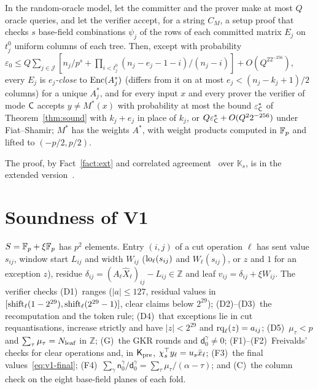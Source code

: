 \begin{theorem}
\label{thm:untrusted}
In the random-oracle model, let the committer and the prover make at most $Q$ oracle queries,
and let the verifier accept, for a string $C_M$, a setup proof that checks
$s$ base-field combinations $\psi_j$ of the rows of each committed matrix $E_j$ on $t^0_j$ uniform
columns of each tree. Then, except
with probability $\varepsilon_0\le Q\sum_{j\in\mathcal J}[n_j/p^s+\prod_{i<t^0_j}(n_j-e_j-1-i)/(n_j-i)]+O(Q^22^{-256})$, every $E_j$ is \emph{$e_j$-close} to $\mathrm{Enc}(A^*_j)$
(differs from it on at most $e_j<(n_j-k_j+1)/2$ columns) for a unique $A^*_j$, and for every input $x$ and every prover the verifier of mode
$\mathsf{C}$ accepts $y\neq M^*(x)$ with probability at most the bound $\varepsilon^*_{\mathsf{C}}$ of
Theorem~\ref{thm:sound} with $k_j+e_j$ in place of $k_j$, or $Q\varepsilon^*_{\mathsf{C}}+O(Q^22^{-256})$
under Fiat--Shamir; $M^*$ has the weights $A^*$, with weight products computed in $\mathbb{F}_p$ and lifted to
$(-p/2,p/2)$.
\end{theorem}

\noindent The proof, by Fact~\ref{fact:ext} and correlated agreement~\cite[Thm.~1.6]{bciks20} over
$\mathbb K_s$, is in the extended version~\cite{fullversion}.



\section{Soundness of V1}
\label{app:v1}

 $S=\mathbb{F}_p+\xi\mathbb{F}_p$ has $p^2$ elements. Entry $(i,j)$ of a cut operation
$\ell$ has sent value $s_{ij}$, window start $L_{ij}$ and width $W_{ij}$ ($\mathrm{lo}_\ell(s_{ij})$ and
$W_\ell(s_{ij})$, or $z$ and $1$ for an exception $z$), residue
$\delta_{ij}=(A_\ell\hat X_\ell)_{ij}-L_{ij}\in\mathbb Z$ and leaf $v_{ij}=\delta_{ij}+\xi W_{ij}$.
The verifier checks (D1)~ranges ($|a|\le127$, residual values in
$[\mathrm{shift}_\ell(1-2^{29}),\mathrm{shift}_\ell(2^{29}-1)]$, clear claims below $2^{29}$); (D2)--(D3)~the
recomputation and the token rule; (D4)~that exceptions lie in cut requantisations,
increase strictly and have $|z|<2^{29}$ and $\mathrm{rq}_\ell(z)=a_{ij}$; (D5)~$\mu_\tau<p$ and
$\sum_\tau\mu_\tau=N_{\mathrm{leaf}}$ in $\mathbb Z$; (G)~the GKR rounds and $\mathsf d_0^\gamma\neq0$;
(F1)--(F2)~Freivalds' checks for clear operations and, in $\mathsf{K}_{\mathrm{pre}}$, $\chi_s^\top y_\ell=u_s\bar x_\ell$;
(F3)~the final values~\eqref{eq:v1-final}; (F4)~$\sum_\gamma\mathsf n_0^\gamma/\mathsf
d_0^\gamma=\sum_\tau\mu_\tau/(\alpha-\tau)$; and (C)~the column check on the eight base-field
planes of each fold.

